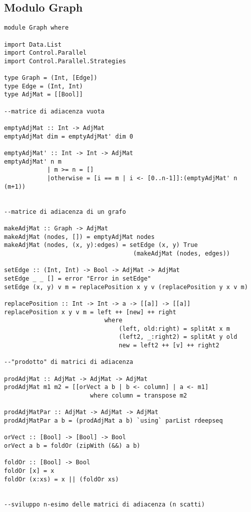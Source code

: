 \subsection{Modulo Graph}
\begin{verbatim}
module Graph where

import Data.List
import Control.Parallel
import Control.Parallel.Strategies

type Graph = (Int, [Edge])
type Edge = (Int, Int)
type AdjMat = [[Bool]]

--matrice di adiacenza vuota

emptyAdjMat :: Int -> AdjMat
emptyAdjMat dim = emptyAdjMat' dim 0

emptyAdjMat' :: Int -> Int -> AdjMat
emptyAdjMat' n m
            | m >= n = []
            |otherwise = [i == m | i <- [0..n-1]]:(emptyAdjMat' n (m+1))

            
--matrice di adiacenza di un grafo            

makeAdjMat :: Graph -> AdjMat
makeAdjMat (nodes, []) = emptyAdjMat nodes
makeAdjMat (nodes, (x, y):edges) = setEdge (x, y) True
                                    (makeAdjMat (nodes, edges))

setEdge :: (Int, Int) -> Bool -> AdjMat -> AdjMat
setEdge _ _ [] = error "Error in setEdge"
setEdge (x, y) v m = replacePosition x y v (replacePosition y x v m)

replacePosition :: Int -> Int -> a -> [[a]] -> [[a]]                            
replacePosition x y v m = left ++ [new] ++ right
                            where
                                (left, old:right) = splitAt x m
                                (left2, _:right2) = splitAt y old
                                new = left2 ++ [v] ++ right2

--"prodotto" di matrici di adiacenza
                        
prodAdjMat :: AdjMat -> AdjMat -> AdjMat
prodAdjMat m1 m2 = [[orVect a b | b <- column] | a <- m1]
                        where column = transpose m2
    
prodAdjMatPar :: AdjMat -> AdjMat -> AdjMat
prodAdjMatPar a b = (prodAdjMat a b) `using` parList rdeepseq
                        
orVect :: [Bool] -> [Bool] -> Bool
orVect a b = foldOr (zipWith (&&) a b)

foldOr :: [Bool] -> Bool
foldOr [x] = x
foldOr (x:xs) = x || (foldOr xs)

                
--sviluppo n-esimo delle matrici di adiacenza (n scatti)
                        

\end{verbatim}
